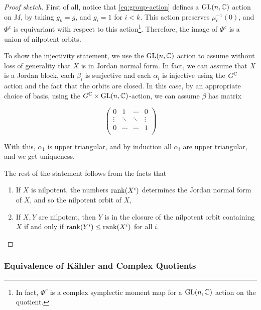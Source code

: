 \documentclass{article}
\begin{document}
\begin{proof}
    [Proof sketch]

    First of all, notice that \cref{eq:group-action} defines a \(\operatorname{GL}(n, \mathbb{C})\) action on \(M\), by taking \(g_k = g\), and \(g_i = 1\) for \(i < k\). This action preserves \(\mu_c^{-1}(0)\), and \(\Phi^c\) is equivariant with respect to this action\footnote{In fact, \(\Phi^c\) is a complex symplectic moment map for a \(\operatorname{GL}(n, \mathbb{C})\) action on the quotient.}. Therefore, the image of \(\Phi^c\) is a union of nilpotent orbits.

    To show the injectivity statement, we use the \(\operatorname{GL}(n, \mathbb{C})\) action to assume without loss of generality that \(X\) is in Jordan normal form. In fact, we can assume that \(X\) is a Jordan block, each \(\beta_i\) is surjective and each \(\alpha_i\) is injective using the \(G^{\mathbb{C}}\) action and the fact that the orbits are closed. In this case, by an appropriate choice of basis, using the \(G^{\mathbb{C}} \times \operatorname{GL}(n, \mathbb{C})\)-action, we can assume \(\beta\) has matrix

    \[\begin{pmatrix}
        0 & 1 & \cdots & 0 \\
        \vdots & \ddots & \ddots & \vdots \\
        0 & \cdots & \cdots & 1 \\
    \end{pmatrix}\]

    With this, \(\alpha_1\) is upper triangular, and by induction all \(\alpha_i\) are upper triangular, and we get uniqueness.

    The rest of the statement follows from the facts that

    \begin{enumerate}
        \item If \(X\) is nilpotent, the numbers \(\rank(X^i)\) determines the Jordan normal form of \(X\), and so the nilpotent orbit of \(X\),
        \item If \(X, Y\) are nilpotent, then \(Y\) is in the closure of the nilpotent orbit containing \(X\) if and only if \(\rank(Y^i) \le \rank(X^i)\) for all \(i\).
    \end{enumerate}
\end{proof}

\subsubsection{Equivalence of K\"ahler and Complex Quotients}
\end{document}
